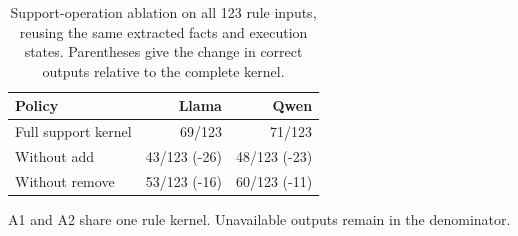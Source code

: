 \begin{table}[t]
\centering
\small
\setlength{\tabcolsep}{6pt}
\caption{Support-operation ablation on all 123 rule inputs, reusing the same extracted facts and execution states. Parentheses give the change in correct outputs relative to the complete kernel.}
\label{tab:support-ablation}
\begin{tabular}{lrr}
\toprule
Policy & Llama & Qwen \\
\midrule
Full support kernel & 69/123 & 71/123 \\
Without add & 43/123 (-26) & 48/123 (-23) \\
Without remove & 53/123 (-16) & 60/123 (-11) \\
\bottomrule
\end{tabular}
\par\smallskip
\begin{minipage}{\linewidth}\footnotesize A1 and A2 share one rule kernel. Unavailable outputs remain in the denominator.\end{minipage}
\end{table}
